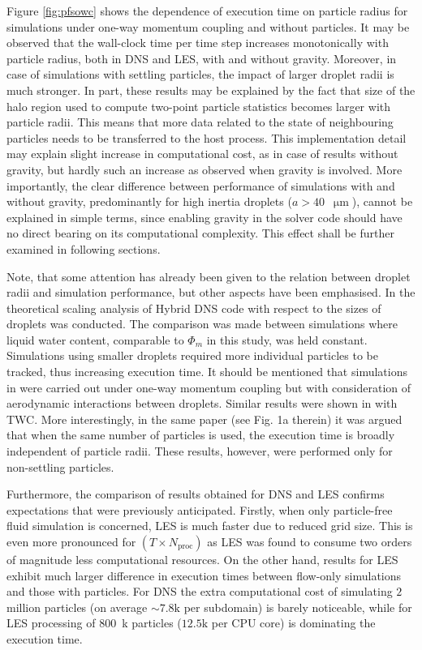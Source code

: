 \documentclass{pracamgren}
\begin{document}
Figure \ref{fig:pfsowc} shows the dependence of execution time on particle radius for simulations under one-way momentum coupling and without particles.
It may be observed that the wall-clock time per time step increases monotonically with particle radius, both in DNS and LES, with and without gravity.
Moreover, in case of simulations with settling particles, the impact of larger droplet radii is much stronger.
In part, these results may be explained by the fact that size of the halo region used to compute two-point particle statistics becomes larger with particle radii.
This means that more data related to the state of neighbouring particles needs to be transferred to the host process.
This implementation detail may explain slight increase in computational cost, as in case of results without gravity, but hardly such an increase as observed when gravity is involved.
More importantly, the clear difference between performance of simulations with and without gravity, predominantly for high inertia droplets (${a > 40}$~$\upmu\text{m}$), cannot be explained in simple terms, since enabling gravity in the solver code should have no direct bearing on its computational complexity.
This effect shall be further examined in following sections.

Note, that some attention has already been given to the relation between droplet radii and simulation performance, but other aspects have been emphasised.
In \textcite[Fig. 8c therein]{Ayala2014} the theoretical scaling analysis of Hybrid DNS code with respect to the sizes of droplets was conducted.
The comparison was made between simulations where liquid water content, comparable to $\Phi_m$ in this study, was held constant.
Simulations using smaller droplets required more individual particles to be tracked, thus increasing execution time.
It should be mentioned that simulations in \parencite{Ayala2014} were carried out under one-way momentum coupling but with consideration of aerodynamic interactions between droplets. 
Similar results were shown in \textcite[Fig. 1b therein]{Rosa2022} with TWC.
More interestingly, in the same paper (see Fig. 1a therein) it was argued that when the same number of particles is used, the execution time is broadly independent of particle radii.
These results, however, were performed only for non-settling particles.

Furthermore, the comparison of results obtained for DNS and LES confirms expectations that were previously anticipated.
Firstly, when only particle-free fluid simulation is concerned, LES is much faster due to reduced grid size.
This is even more pronounced for $(T \times N_{\text{proc}})$ as LES was found to consume two orders of magnitude less computational resources.
On the other hand, results for LES exhibit much larger difference in execution times between flow-only simulations and those with particles.
For DNS the extra computational cost of simulating $2$ million particles (on average $\sim 7.8\text{k}$ per subdomain) is barely noticeable, while for LES processing of $800$~k particles ($12.5\text{k}$ per CPU core) is dominating the execution time. 
\end{document}
